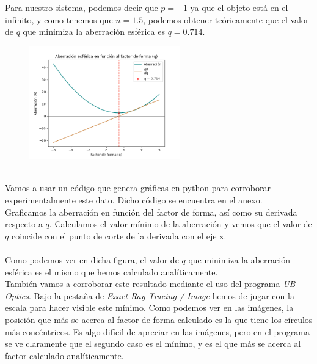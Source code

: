 \documentclass[11pt]{article}
\begin{document}
            Para nuestro sistema, podemos decir que $p=-1$ ya que el objeto está en el infinito, y como tenemos que $n=1.5$, podemos obtener teóricamente que el valor de $q$ que minimiza la aberración esférica es $q=0.714$. \\
            
            \begin{figure}
                \vspace{-0.8cm}
                \centering
                \includegraphics[width=0.58\textwidth]{fotos/parte 1/Aberraciones/Aberración Esférica/factor_de_forma.png}
            \end{figure}
            
            \hspace{0cm}\\Vamos a usar un código que genera gráficas en python para corroborar experimentalmente este dato. Dicho código se encuentra en el anexo.\\

            Graficamos la aberración en función del factor de forma, así como su derivada respecto a $q$. Calculamos el valor mínimo de la aberración y vemos que el valor de $q$ coincide con el punto de corte de la derivada con el eje x.\\\hspace{0cm}\\
            
            Como podemos ver en dicha figura, el valor de $q$ que minimiza la aberración esférica es el mismo que hemos calculado analíticamente.\\

            \clearpage
            También vamos a corroborar este resultado mediante el uso del programa \textit{UB Optics}. Bajo la pestaña de \textit{Exact Ray Tracing / Image} hemos de jugar con la escala para hacer visible este mínimo. Como podemos ver en las imágenes, la posición que más se acerca al factor de forma calculado es la que tiene los círculos más concéntricos. Es algo difícil de apreciar en las imágenes, pero en el programa se ve claramente que el segundo caso es el mínimo, y es el que más se acerca al factor calculado analíticamente. 
\end{document}

